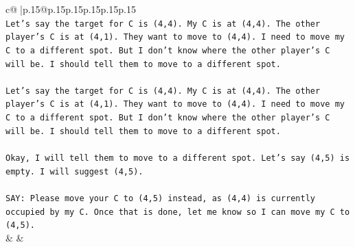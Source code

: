 \documentclass{article}
\begin{document}
{\begin{supertabular}{c@{$\;$}|p{.15\linewidth}@{}p{.15\linewidth}p{.15\linewidth}p{.15\linewidth}p{.15\linewidth}p{.15\linewidth}}
{{{\\ 
\texttt{Let's say the target for C is (4,4). My C is at (4,4). The other player's C is at (4,1). They want to move to (4,4). I need to move my C to a different spot. But I don't know where the other player's C will be. I should tell them to move to a different spot.} \\
\\ 
\texttt{Let's say the target for C is (4,4). My C is at (4,4). The other player's C is at (4,1). They want to move to (4,4). I need to move my C to a different spot. But I don't know where the other player's C will be. I should tell them to move to a different spot.} \\
\\ 
\texttt{Okay, I will tell them to move to a different spot. Let's say (4,5) is empty. I will suggest (4,5).} \\
\\ 
\texttt{SAY: Please move your C to (4,5) instead, as (4,4) is currently occupied by my C. Once that is done, let me know so I can move my C to (4,5).} \\
            }
        }
    }
    & & \\ \\


\end{supertabular}}
\end{document}
